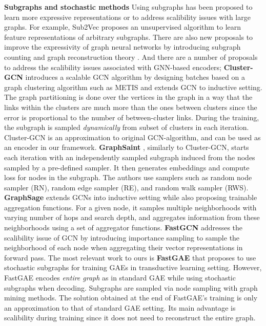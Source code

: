 \documentclass{article}
\begin{document}
\textbf{Subgraphs and stochastic methods} Using subgraphs has been proposed to learn more expressive representations or to address scalibility issues with large graphs. For example, Sub2Vec \citep{adhikari2018sub2vec} proposes an unsupervised algorithm to learn feature representations of arbitrary subgraphs. There are also new proposals to improve the expressivity of  graph neural networks by introducing subgraph counting \citep{ bouritsas2021improving} and graph reconstruction theory \citep{cotta2021reconstruction}. And there are a number of proposals to address the scalibility issues associated with GNN-based encoders; \textbf{Cluster-GCN} \citep{chiang2019cluster} introduces a scalable GCN algorithm by designing batches based on a graph clustering algorithm such as METIS \citep{karypis1998fast} and extends GCN \citep{kipf2016semi} to inductive setting. The graph partitioning is done over the vertices in the graph in a way that the links within the clusters are much more than the ones between clusters since the error is proportional to the number of between-cluster links. During the training, the subgraph is sampled \textit{dynamically} from subset of clusters in each iteration. Cluster-GCN is an approximation to original GCN-algorithm, and can be used as an encoder in our framework. \textbf{GraphSaint} \citep{zeng2019graphsaint}, similarly to Cluster-GCN, starts each iteration with an independently sampled subgraph induced from  the nodes sampled by a pre-defined sampler. It then generates embeddings and compute loss for nodes in the subgraph. The authors use samplers such as random node sampler (RN), random edge sampler (RE), and random walk sampler (RWS). \textbf{GraphSage} \citep{hamilton2017inductive} extends GCNs into inductive setting while also proposing trainable aggregation functions. For a given node, it samples multiple neighborhoods with varying number of hops and search depth, and aggregates information from these neighborhoods using a set of aggregator functions. \textbf{FastGCN} \citep{chen2018fastgcn} addresses the scalibility issue of GCN by introducing importance sampling to sample the neighborhood of each node when aggregating their vector representations in forward pass. The most relevant work to ours is \textbf{FastGAE} \citep{salha2021fastgae} that proposes to use stochastic subgraphs for training GAEs in transductive learning setting. However, FastGAE encodes \textit{entire graph} as in standard GAE while using stochastic subgraphs when decoding. Subgraphs are sampled via node sampling with graph mining methods. The solution obtained at the end of FastGAE's training is only an approximation to that of standard GAE setting. Its main advantage is scalibility during training since it does not need to reconstruct the entire graph. 
\end{document}
